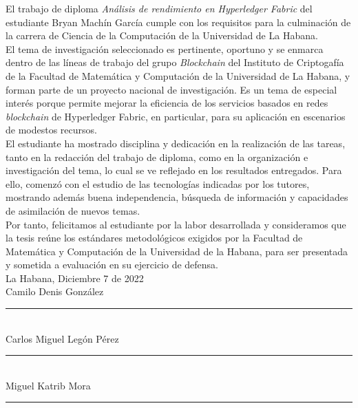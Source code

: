\begin{opinion}
El trabajo de diploma \emph{An\'alisis de rendimiento en Hyperledger Fabric} del estudiante Bryan Mach\'in Garc\'ia cumple con los requisitos para la culminaci\'on de la carrera de Ciencia de la Computaci\'on de la Universidad de La Habana.\\

El tema de investigaci\'on seleccionado es pertinente, oportuno y se enmarca dentro de las l\'ineas de trabajo del grupo \emph{Blockchain} del Instituto de Criptogaf\'ia de la Facultad de Matem\'atica y Computaci\'on de la Universidad de La Habana, y forman parte de un proyecto nacional de investigaci\'on. Es un tema de especial inter\'es porque permite mejorar la eficiencia de los servicios basados en redes \emph{blockchain} de Hyperledger Fabric, en particular, para su aplicaci\'on en escenarios de modestos recursos.\\

El estudiante ha mostrado disciplina y dedicaci\'on en la realizaci\'on de las tareas, tanto en la redacci\'on del trabajo de diploma, como en la organizaci\'on e investigaci\'on del tema, lo cual se ve reflejado en los resultados entregados. Para ello, comenz\'o con el estudio de las tecnolog\'ias indicadas por los tutores, mostrando adem\'as buena independencia, b\'usqueda de informaci\'on y capacidades de asimilaci\'on de nuevos temas.\\


Por tanto, felicitamos al estudiante por la labor desarrollada y consideramos que la tesis re\'une los est\'andares metodol\'ogicos exigidos por la Facultad de Matem\'atica y Computaci\'on de la Universidad de la Habana, para ser presentada y sometida a evaluaci\'on en su ejercicio de defensa.\\

La Habana, Diciembre 7 de 2022\\

Camilo Denis Gonz\'alez \rule{20 mm}{0.1 mm}\\

Carlos Miguel Leg\'on P\'erez \rule{20 mm}{0.1 mm}\\

Miguel Katrib Mora \rule{20 mm}{0.1 mm}\\

\end{opinion}
